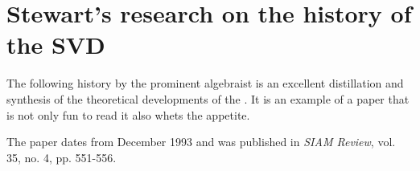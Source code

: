 \chapter{Stewart's research on the history of the SVD}

The following history by the prominent algebraist is an excellent distillation and synthesis of the theoretical developments of the \svdp. It is an example of a paper that is not only fun to read it also whets the appetite.

The paper dates from December 1993 and was published in \emph{SIAM Review}, vol. 35, no. 4, pp. 551-556.



\endinput